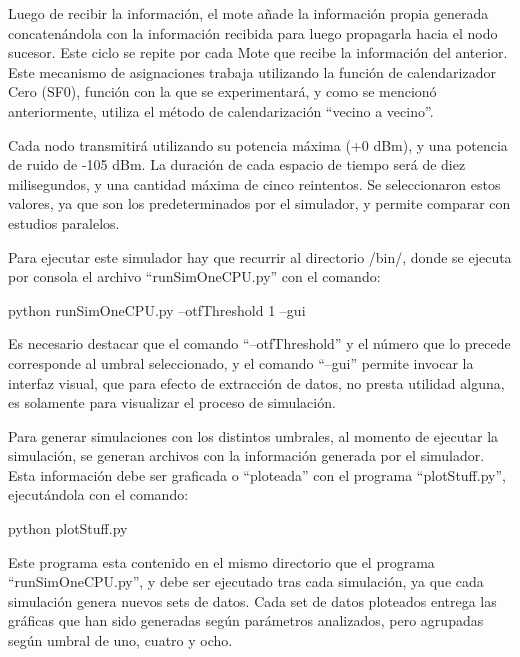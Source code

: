 Luego de recibir la información, el mote añade la información propia generada concatenándola con la información recibida para luego propagarla hacia el nodo sucesor. Este ciclo se repite por cada Mote que recibe la información del anterior. Este mecanismo de asignaciones trabaja utilizando la función de calendarizador Cero (SF0), función con la que se experimentará, y como se mencionó anteriormente, utiliza el método de calendarización ``vecino a vecino''\cite{dujovne-6tisch-6top-sf0-01}.

Cada nodo transmitirá utilizando su potencia máxima (+0 dBm), y una potencia de ruido de -105 dBm. La duración de cada espacio de tiempo será de diez milisegundos, y una cantidad máxima de cinco reintentos. Se seleccionaron estos valores, ya que son los predeterminados por el simulador, y permite comparar con estudios paralelos.

Para ejecutar este simulador hay que recurrir al directorio {\ttfamily /bin/}, donde se ejecuta por consola el archivo ``runSimOneCPU.py'' con el comando:

\begin{ttfamily}
    python runSimOneCPU.py --otfThreshold 1 --gui

\end{ttfamily}


Es necesario destacar que el comando ``--otfThreshold'' y el número que lo precede corresponde al umbral seleccionado, y el comando ``--gui'' permite invocar la interfaz visual, que para efecto de extracción de datos, no presta utilidad alguna, es solamente para visualizar el proceso de simulación.

Para generar simulaciones con los distintos umbrales, al momento de ejecutar la simulación, se generan archivos con la información generada por el simulador. Esta información debe ser graficada o ``ploteada'' con el programa ``plotStuff.py'', ejecutándola con el comando:

\begin{ttfamily}
    python plotStuff.py

\end{ttfamily}

Este programa esta contenido en el mismo directorio que el programa ``runSimOneCPU.py'', y debe ser ejecutado tras cada simulación, ya que cada simulación genera nuevos sets de datos. Cada set de datos ploteados entrega las gráficas que han sido generadas según parámetros analizados, pero agrupadas según umbral de uno, cuatro y ocho.



